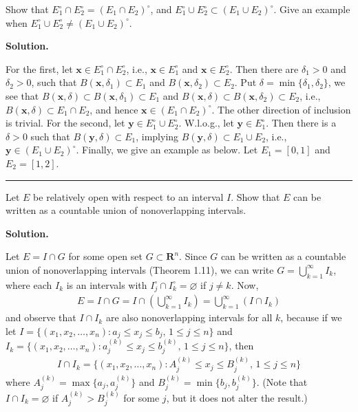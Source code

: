 \documentclass[12pt]{article}
\theoremstyle{definition}
\begin{document}
Show that $E_1^\circ\cap E_2^\circ=(E_1\cap E_2)^\circ$, and $E_1^\circ\cup E_2^\circ\subset(E_1\cup E_2)^\circ$. Give an example when $E_1^\circ\cup E_2^\circ\ne(E_1\cup E_2)^\circ$.

\smallskip
\noindent\textbf{Solution.}\quad

For the first, let $\mathbf{x}\in E_1^\circ\cap E_2^\circ$, i.e., $\mathbf{x}\in E_1^\circ$ and $\mathbf{x}\in E_2^\circ$. Then there are $\delta_1>0$ and $\delta_2>0$, such that $B(\mathbf{x},\delta_1)\subset E_1$ and $B(\mathbf{x},\delta_2)\subset E_2$. Put $\delta=\min\{\delta_1,\delta_2\}$, we see that $B(\mathbf{x},\delta)\subset B(\mathbf{x},\delta_1)\subset E_1$ and $B(\mathbf{x},\delta)\subset B(\mathbf{x},\delta_2)\subset E_2$, i.e., $B(\mathbf{x},\delta)\subset E_1\cap E_2$, and hence $\mathbf{x}\in(E_1\cap E_2)^\circ$. The other direction of inclusion is trivial. For the second, let $\mathbf{y}\in E_1^\circ\cup E_2^\circ$. W.l.o.g., let $\mathbf{y}\in E_1^\circ$. Then there is a $\delta>0$ such that $B(\mathbf{y},\delta)\subset E_1$, implying $B(\mathbf{y},\delta)\subset E_1\cup E_2$, i.e., $\mathbf{y}\in(E_1\cup E_2)^\circ$. Finally, we give an example as below. Let $E_1=[0,1]$ and $E_2=[1,2]$.



\bigskip\noindent\hrule\bigskip

Let $E$ be relatively open with respect to an interval $I$. Show that $E$ can be written as a countable union of nonoverlapping intervals.

\smallskip
\noindent\textbf{Solution.}\quad

Let $E=I\cap G$ for some open set $G\subset\mathbf{R}^n$. Since $G$ can be written as a countable union of nonoverlapping intervals (Theorem 1.11), we can write $G=\bigcup_{k=1}^\infty I_k$, where each $I_k$ is an intervals with $I_j^\circ\cap I_k^\circ=\varnothing$ if $j\ne k$. Now,
\begin{align*}
E
=I\cap G
=I\cap\left(\bigcup_{k=1}^\infty I_k\right)
=\bigcup_{k=1}^\infty(I\cap I_k)
\end{align*}
and observe that $I\cap I_k$ are also nonoverlapping intervals for all $k$, because if we let $I=\{(x_1,x_2,\ldots,x_n):a_j\le x_j\le b_j,\,1\le j\le n\}$ and $I_k=\{(x_1,x_2,\ldots,x_n):a_j^{(k)}\le x_j\le b_j^{(k)},\,1\le j\le n\}$, then
\begin{align*}
I\cap I_k
=\{(x_1,x_2,\ldots,x_n):A_j^{(k)}\le x_j\le B_j^{(k)},\,1\le j\le n\}
\end{align*}
where $A_j^{(k)}=\max\{a_j,a_j^{(k)}\}$ and $B_j^{(k)}=\min\{b_j,b_j^{(k)}\}$. (Note that $I\cap I_k=\varnothing$ if $A_j^{(k)}>B_j^{(k)}$ for some $j$, but it does not alter the result.)
\end{document}
